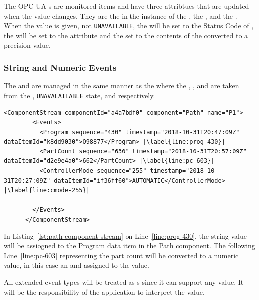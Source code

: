 The OPC UA s are monitored items and have three attribtues that are updated when the value changes. They are the  in the instance of the , the , and the . When the value is given, not \texttt{UNAVAILABLE}, the  will be set to the Status Code of , the  will be set to the  attribute and the  set to the contents of the  converted to a  precision value.

\subsubsection{String and Numeric Events}\label{sec:sting-numeric-events}

The  and   are managed in the same manner as the  where the , , and  are taken from the , \texttt{UNAVALAILABLE} state, and  respectively.

\begin{lstlisting}[firstnumber=last,escapechar=|,%
    caption={Path Component Stream},label={lst:path-component-stream}]
      <ComponentStream componentId="a4a7bdf0" component="Path" name="P1">
        <Events>
          <Program sequence="430" timestamp="2018-10-31T20:47:09Z" dataItemId="k8dd9030">O98877</Program> |\label{line:prog-430}|
          <PartCount sequence="630" timestamp="2018-10-31T20:57:09Z" dataItemId="d2e9e4a0">662</PartCount> |\label{line:pc-603}|
          <ControllerMode sequence="255" timestamp="2018-10-31T20:27:09Z" dataItemId="if36ff60">AUTOMATIC</ControllerMode> |\label{line:cmode-255}|

        </Events>
      </ComponentStream>
\end{lstlisting}

In Listing~\ref{lst:path-component-stream} on Line~\ref{line:prog-430}, the string value will be assiogned to the Program data item in the Path component. The following Line~\ref{line:pc-603} representing the part count will be converted to a numeric value, in this case an  and assigned to the value.

All extended event types will be treated as s since it can support any value. It will be the responsibility of the application to interpret the value.
 
